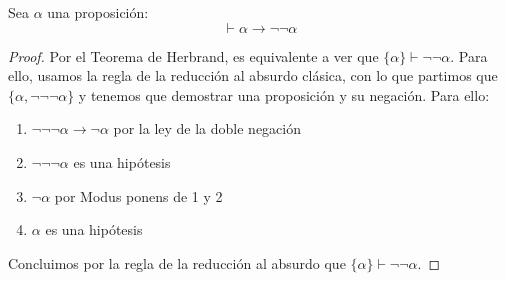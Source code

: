 \begin{prop}
    Sea $\alpha$ una proposición:
    \begin{equation*}
        \vdash \alpha\to\lnot\lnot\alpha
    \end{equation*}
    \begin{proof}
        Por el Teorema de Herbrand, es equivalente a ver que $\{\alpha\}\vdash \lnot\lnot\alpha$. Para ello, usamos la regla de la reducción al absurdo clásica, con lo que partimos que $\{\alpha,\lnot\lnot\lnot\alpha\}$ y tenemos que demostrar una proposición y su negación. Para ello:
        \begin{enumerate}
            \item $\lnot\lnot\lnot\alpha\to\lnot\alpha$ por la ley de la doble negación
            \item $\lnot\lnot\lnot\alpha$ es una hipótesis
            \item $\lnot\alpha$ por Modus ponens de 1 y 2
            \item $\alpha$ es una hipótesis
        \end{enumerate}
        Concluimos por la regla de la reducción al absurdo que $\{\alpha\}\vdash \lnot\lnot\alpha$.
    \end{proof}
\end{prop}
